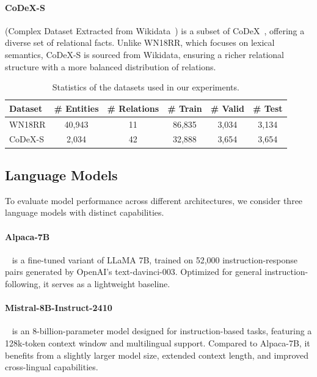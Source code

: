 \documentclass[12pt,a4paper]{article}
\begin{document}
\paragraph{CoDeX-S} (Complex Dataset Extracted from Wikidata~\cite{wikidata}) is a subset of CoDeX~\cite{safavi2020codex}, offering a diverse set of relational facts.
Unlike WN18RR, which focuses on lexical semantics, CoDeX-S is sourced from Wikidata, ensuring a richer relational structure with a more balanced distribution of relations.

\begin{table}[h]
    \centering
    \begin{tabular}{l c c c c c}
        \hline
        \textbf{Dataset} & \textbf{\# Entities} & \textbf{\# Relations} & \textbf{\# Train} & \textbf{\# Valid} & \textbf{\# Test} \\
        \hline
        WN18RR           & 40,943               & 11                    & 86,835            & 3,034             & 3,134            \\
        CoDeX-S          & 2,034                & 42                    & 32,888            & 3,654             & 3,654            \\
        \hline
    \end{tabular}
    \caption{Statistics of the datasets used in our experiments.}
    \label{tab:datasets}
\end{table}

\subsection{Language Models}

To evaluate model performance across different architectures, we consider three language models with distinct capabilities.

\paragraph{Alpaca-7B}~\cite{taori2023stanford} is a fine-tuned variant of LLaMA 7B, trained on 52,000 instruction-response pairs generated by OpenAI’s text-davinci-003.
Optimized for general instruction-following, it serves as a lightweight baseline.

\paragraph{Mistral-8B-Instruct-2410}~\cite{mistralai2024ministral8b} is an 8-billion-parameter model designed for instruction-based tasks, featuring a 128k-token context window and multilingual support.
Compared to Alpaca-7B, it benefits from a slightly larger model size, extended context length, and improved cross-lingual capabilities.
\end{document}
